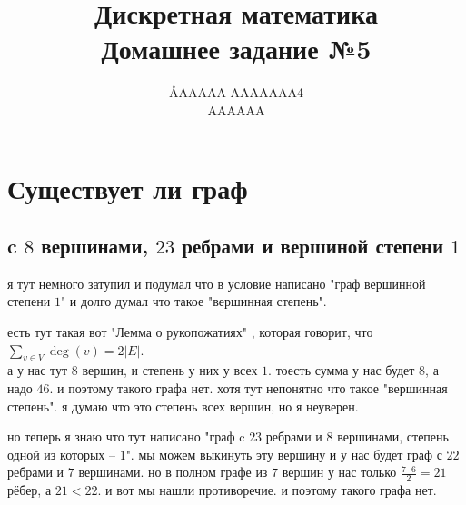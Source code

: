 \documentclass{article}
\title{Дискретная математика \\ Домашнее задание №5}
\author{\AA{AAAAA AAAAAAA}{4} \\ AAAAAA}
\newcommand{\ds}{\displaystyle}
\renewcommand{\f}{\frac}
\begin{document}
  \maketitle

  \section{Существует ли граф}
  \subsection{c $8$ вершинами, $23$ ребрами и вершиной степени $1$}
  я тут немного затупил и подумал что в условие написано "{}граф вершинной степени $1$"{}
  и долго думал что такое "{}вершинная степень"{}.
  \begin{cross}
    есть тут такая вот "{}Лемма о рукопожатиях"{} \cite{lem}, которая говорит, что $\ds \sum_{v\in V}\deg(v)=2|E|$. \\
    а у нас тут $8$ вершин, и степень у них у всех $1$.
    тоесть сумма у нас будет $8$, а надо $46$.
    и поэтому такого графа нет.
    хотя тут непонятно что такое "{}вершинная степень"{}.
    я думаю что это степень всех вершин, но я неуверен.
  \end{cross}

  но теперь я знаю что тут написано "{}граф c $23$ ребрами и $8$ вершинами, степень одной из которых -- $1$"{}.
  мы можем выкинуть эту вершину и у нас будет граф с $22$ ребрами и $7$ вершинами.
  но в полном графе из $7$ вершин у нас только $\f{7 \cdot 6}{2}=21$ рёбер, а $21 < 22$.
  и вот мы нашли противоречие.
  и поэтому такого графа нет.
\end{document}
